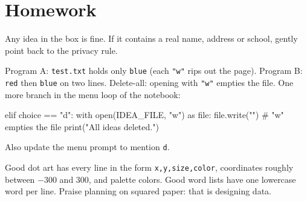 \section{Homework}
\begin{answer}
Any idea in the box is fine. If it contains a real name, address or school, gently point back to the privacy rule.
\end{answer}

\begin{answer}
Program A: \texttt{test.txt} holds only \texttt{blue} (each \texttt{"w"} rips out the page). Program B: \texttt{red} then \texttt{blue} on two lines.
Delete-all: opening with \texttt{"w"} empties the file. One more branch in the menu loop of the notebook:
\end{answer}
\begin{pycode}
        elif choice == "d":
            with open(IDEA_FILE, "w") as file:
                file.write("")       # "w" empties the file
            print("All ideas deleted.")
\end{pycode}
Also update the menu prompt to mention \texttt{d}.

\begin{answer}[Creative]
Good dot art has every line in the form \texttt{x,y,size,color}, coordinates roughly between $-300$ and $300$, and palette colors.
Good word lists have one lowercase word per line. Praise planning on squared paper: that is designing data.
\end{answer}
